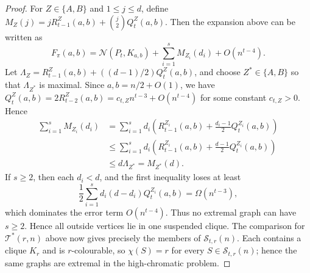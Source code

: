 \documentclass[10pt,a4paper]{amsart}
\newcommand{\N}{\mathcal N}
\newcommand{\cS}{\mathcal S}
\newcommand{\cT}{\mathcal T}
\begin{document}
\begin{proof}
For $Z\in\{A,B\}$ and $1\le j\le d$, define $M_Z(j)=jR_{t-1}^Z(a,b)+\binom j2 Q_t^Z(a,b)$.
Then the expansion above can be written as
\[
        F_\pi(a,b)=\N(P_t,K_{a,b})+\sum_{i=1}^s M_{Z_i}(d_i)+O(n^{t-4}).
\]
Let $\Lambda_Z=R_{t-1}^Z(a,b)+((d-1)/2)Q_t^Z(a,b)$, and choose $Z^*\in\{A,B\}$ so that $\Lambda_{Z^*}$ is maximal. Since $a,b=n/2+O(1)$, we have $Q_t^Z(a,b)=2R_{t-2}^Z(a,b)=c_{t,Z}n^{t-3}+O(n^{t-4})$ for some constant $c_{t,Z}>0$. Hence
\[
\begin{aligned}
        \sum_{i=1}^s M_{Z_i}(d_i)
        &=\sum_{i=1}^s d_i\left(R_{t-1}^{Z_i}(a,b)+\frac{d_i-1}{2}Q_t^{Z_i}(a,b)\right)\\
        &\le \sum_{i=1}^s d_i\left(R_{t-1}^{Z_i}(a,b)+\frac{d-1}{2}Q_t^{Z_i}(a,b)\right)\\
        &\le d\Lambda_{Z^*}=M_{Z^*}(d).
\end{aligned}
\]
If $s\ge2$, then each $d_i<d$, and the first inequality loses at least
\[
        \frac12\sum_{i=1}^s d_i(d-d_i)Q_t^{Z_i}(a,b)=\Omega(n^{t-3}),
\]
which dominates the error term $O(n^{t-4})$. Thus no extremal graph can have $s\ge2$. Hence all outside vertices lie in one suspended clique. The comparison for $\cT^*(r,n)$ above now gives precisely the members of $\cS_{t,r}(n)$. Each contains a clique $K_r$ and is $r$-colourable, so $\chi(S)=r$ for every $S\in\cS_{t,r}(n)$; hence the same graphs are extremal in the high-chromatic problem.
\end{proof}
\end{document}
